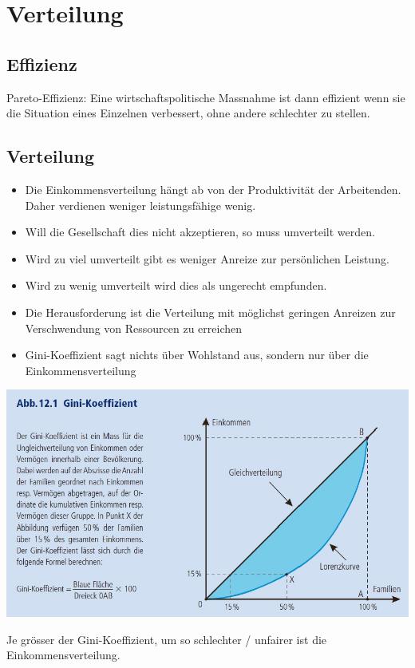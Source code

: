 \section{Verteilung}
\subsection{Effizienz}
Pareto-Effizienz: Eine wirtschaftspolitische Massnahme ist dann effizient wenn sie die Situation eines Einzelnen verbessert, ohne andere schlechter zu stellen. 
\subsection{Verteilung}
\begin{itemize}
	\item Die Einkommensverteilung hängt ab von der Produktivität der Arbeitenden.
	\subitem Daher verdienen weniger leistungsfähige wenig.
	\item Will die Gesellschaft dies nicht akzeptieren, so muss umverteilt werden.
	\item Wird zu viel umverteilt gibt es weniger Anreize zur persönlichen Leistung.
	\item Wird zu wenig umverteilt wird dies als ungerecht empfunden.
	\item Die Herausforderung ist die Verteilung mit möglichst geringen Anreizen zur Verschwendung von Ressourcen zu erreichen
	\item Gini-Koeffizient sagt nichts über Wohlstand aus, sondern nur über die Einkommensverteilung
\end{itemize}
\begin{minipage}{0.7\linewidth}
    \includegraphics[width=\linewidth]{images/gini.jpg}
\end{minipage}
\begin{minipage}{0.3\linewidth}
    Je grösser der Gini-Koeffizient, um so schlechter / unfairer ist die Einkommensverteilung.
\end{minipage}
